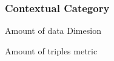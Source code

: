 
\subsubsection{Contextual Category}
\label{sec:Contextual} 

Amount of data Dimesion

Amount of triples metric
